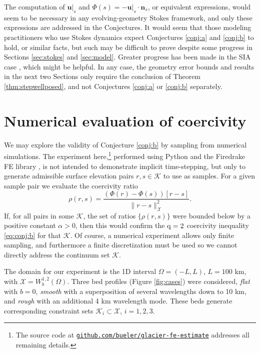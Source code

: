 \documentclass[hidelinks,onefignum,onetabnum,final]{siamart220329}  %
\newcommand{\bn}{\mathbf{n}}
\newcommand{\bu}{\mathbf{u}}
\newcommand{\cK}{\mathcal{K}}
\newcommand{\cX}{\mathcal{X}}
\newcommand{\qq}{{\text{\textnormal{q}}}}
\begin{document}
The computation of $\bu|_s$ and $\Phi(s)=-\bu|_s\cdot \bn_s$, or equivalent expressions, would seem to be necessary in any evolving-geometry Stokes framework, and only these expressions are addressed in the Conjectures.  It would seem that those modeling practitioners who use Stokes dynamics expect Conjectures \ref{conj:a} and \ref{conj:b} to hold, or similar facts, but such may be difficult to prove despite some progress in Sections \ref{sec:stokes} and \ref{sec:model}.  Greater progress has been made in the SIA case \cite{Calvoetal2003,JouvetBueler2012,PiersantiTemam2023}, which might be helpful.  In any case, the geometry error bounds and results in the next two Sections only require the conclusion of Theorem \ref{thm:stepwellposed}, and not Conjectures \ref{conj:a} or \ref{conj:b} separately.


\section{Numerical evaluation of coercivity} \label{sec:numerical}

We may explore the validity of Conjecture \ref{conj:b} by sampling from numerical simulations.  The experiment here,\footnote{The source code at \href{https://github.com/bueler/glacier-fe-estimate}{\texttt{github.com/bueler/glacier-fe-estimate}} addresses all remaining details.} performed using Python and the Firedrake FE library \cite{Hametal2023}, is not intended to demonstrate implicit time-stepping, but only to generate admissible surface elevation pairs $r,s\in\cK$ to use as samples.  For a given sample pair we evaluate the coercivity ratio
\begin{equation}
\rho(r,s) = \frac{\left(\Phi(r) - \Phi(s)\right)[r-s]}{\|r-s\|_{\cX}^2}. \label{eq:Phiratio}
\end{equation}
If, for all pairs in some $\cK$, the set of ratios $\{\rho(r,s)\}$ were bounded below by a positive constant $\alpha>0$, then this would confirm the $\qq=2$ coercivity inequality \eqref{eq:conj:b} for that $\cK$.  Of course, a numerical experiment allows only finite sampling, and furthermore a finite discretization must be used so we cannot directly address the continuum set $\cK$.

The domain for our experiment is the 1D interval $\Omega=(-L,L)$, $L=100$ km, with $\cX = W_b^{1,2}(\Omega)$.  Three bed profiles  (Figure \ref{fig:cases}) were considered, \emph{flat} with $b=0$, \emph{smooth} with a superposition of several wavelengths down to 10 km, and \emph{rough} with an additional 4 km wavelength mode.  These beds generate corresponding constraint sets $\cK_i \subset \cX$, $i=1,2,3$.
\end{document}
